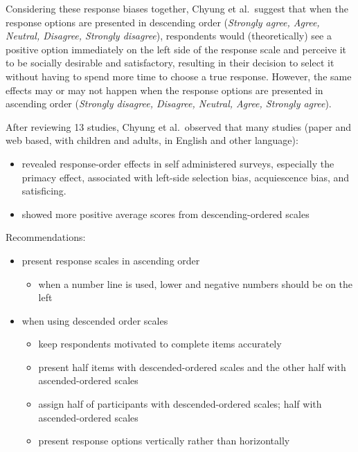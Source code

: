 \documentclass[
  english,
]{book}
\providecommand{\tightlist}{%
  \setlength{\itemsep}{0pt}\setlength{\parskip}{0pt}}
\begin{document}
Considering these response biases together, Chyung et al.~suggest that when the response options are presented in descending order (\emph{Strongly agree, Agree, Neutral, Disagree, Strongly disagree}), respondents would (theoretically) see a positive option immediately on the left side of the response scale and perceive it to be socially desirable and satisfactory, resulting in their decision to select it without having to spend more time to choose a true response. However, the same effects may or may not happen when the response options are presented in ascending order (\emph{Strongly disagree, Disagree, Neutral, Agree, Strongly agree}).

After reviewing 13 studies, Chyung et al.~observed that many studies (paper and web based, with children and adults, in English and other language):

\begin{itemize}
\tightlist
\item
  revealed response-order effects in self administered surveys, especially the primacy effect, associated with left-side selection bias, acquiescence bias, and satisficing.
\item
  showed more positive average scores from descending-ordered scales
\end{itemize}

Recommendations:

\begin{itemize}
\tightlist
\item
  present response scales in ascending order

  \begin{itemize}
  \tightlist
  \item
    when a number line is used, lower and negative numbers should be on the left
  \end{itemize}
\item
  when using descended order scales

  \begin{itemize}
  \tightlist
  \item
    keep respondents motivated to complete items accurately
  \item
    present half items with descended-ordered scales and the other half with ascended-ordered scales
  \item
    assign half of participants with descended-ordered scales; half with ascended-ordered scales
  \item
    present response options vertically rather than horizontally
  \end{itemize}
\end{itemize}
\end{document}
